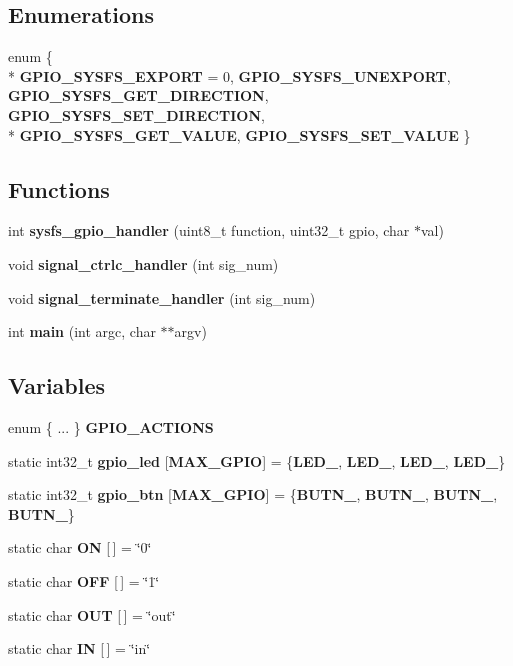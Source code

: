 \subsection*{Enumerations}
\begin{DoxyCompactItemize}
\item 
enum \{ \\*
{\bf G\-P\-I\-O\-\_\-\-S\-Y\-S\-F\-S\-\_\-\-E\-X\-P\-O\-R\-T} = 0, 
{\bf G\-P\-I\-O\-\_\-\-S\-Y\-S\-F\-S\-\_\-\-U\-N\-E\-X\-P\-O\-R\-T}, 
{\bf G\-P\-I\-O\-\_\-\-S\-Y\-S\-F\-S\-\_\-\-G\-E\-T\-\_\-\-D\-I\-R\-E\-C\-T\-I\-O\-N}, 
{\bf G\-P\-I\-O\-\_\-\-S\-Y\-S\-F\-S\-\_\-\-S\-E\-T\-\_\-\-D\-I\-R\-E\-C\-T\-I\-O\-N}, 
\\*
{\bf G\-P\-I\-O\-\_\-\-S\-Y\-S\-F\-S\-\_\-\-G\-E\-T\-\_\-\-V\-A\-L\-U\-E}, 
{\bf G\-P\-I\-O\-\_\-\-S\-Y\-S\-F\-S\-\_\-\-S\-E\-T\-\_\-\-V\-A\-L\-U\-E}
 \}
\end{DoxyCompactItemize}
\subsection*{Functions}
\begin{DoxyCompactItemize}
\item 
int {\bf sysfs\-\_\-gpio\-\_\-handler} (uint8\-\_\-t function, uint32\-\_\-t gpio, char $\ast$val)
\item 
void {\bf signal\-\_\-ctrlc\-\_\-handler} (int sig\-\_\-num)
\item 
void {\bf signal\-\_\-terminate\-\_\-handler} (int sig\-\_\-num)
\item 
int {\bf main} (int argc, char $\ast$$\ast$argv)
\end{DoxyCompactItemize}
\subsection*{Variables}
\begin{DoxyCompactItemize}
\item 
enum  \{ ... \}  {\bf G\-P\-I\-O\-\_\-\-A\-C\-T\-I\-O\-N\-S}
\item 
static int32\-\_\-t {\bf gpio\-\_\-led} [{\bf M\-A\-X\-\_\-\-G\-P\-I\-O}] = \{{\bf L\-E\-D\-\_}, {\bf L\-E\-D\-\_}, {\bf L\-E\-D\-\_}, {\bf L\-E\-D\-\_}\}
\item 
static int32\-\_\-t {\bf gpio\-\_\-btn} [{\bf M\-A\-X\-\_\-\-G\-P\-I\-O}] = \{{\bf B\-U\-T\-N\-\_}, {\bf B\-U\-T\-N\-\_}, {\bf B\-U\-T\-N\-\_}, {\bf B\-U\-T\-N\-\_}\}
\item 
static char {\bf O\-N} [$\,$] = \char`\"{}0\char`\"{}
\item 
static char {\bf O\-F\-F} [$\,$] = \char`\"{}1\char`\"{}
\item 
static char {\bf O\-U\-T} [$\,$] = \char`\"{}out\char`\"{}
\item 
static char {\bf I\-N} [$\,$] = \char`\"{}in\char`\"{}
\end{DoxyCompactItemize}


